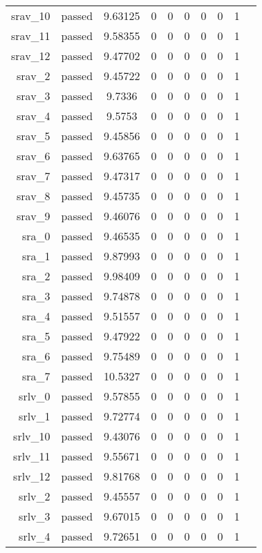 \begin{longtable}{r|ccccccccc}
    srav\_10 & passed & 9.63125 & 0 & 0 & 0 & 0 & 0 & 1 \\
    srav\_11 & passed & 9.58355 & 0 & 0 & 0 & 0 & 0 & 1 \\
    srav\_12 & passed & 9.47702 & 0 & 0 & 0 & 0 & 0 & 1 \\
    srav\_2 & passed & 9.45722 & 0 & 0 & 0 & 0 & 0 & 1 \\
    srav\_3 & passed & 9.7336 & 0 & 0 & 0 & 0 & 0 & 1 \\
    srav\_4 & passed & 9.5753 & 0 & 0 & 0 & 0 & 0 & 1 \\
    srav\_5 & passed & 9.45856 & 0 & 0 & 0 & 0 & 0 & 1 \\
    srav\_6 & passed & 9.63765 & 0 & 0 & 0 & 0 & 0 & 1 \\
    srav\_7 & passed & 9.47317 & 0 & 0 & 0 & 0 & 0 & 1 \\
    srav\_8 & passed & 9.45735 & 0 & 0 & 0 & 0 & 0 & 1 \\
    srav\_9 & passed & 9.46076 & 0 & 0 & 0 & 0 & 0 & 1 \\
    sra\_0 & passed & 9.46535 & 0 & 0 & 0 & 0 & 0 & 1 \\
    sra\_1 & passed & 9.87993 & 0 & 0 & 0 & 0 & 0 & 1 \\
    sra\_2 & passed & 9.98409 & 0 & 0 & 0 & 0 & 0 & 1 \\
    sra\_3 & passed & 9.74878 & 0 & 0 & 0 & 0 & 0 & 1 \\
    sra\_4 & passed & 9.51557 & 0 & 0 & 0 & 0 & 0 & 1 \\
    sra\_5 & passed & 9.47922 & 0 & 0 & 0 & 0 & 0 & 1 \\
    sra\_6 & passed & 9.75489 & 0 & 0 & 0 & 0 & 0 & 1 \\
    sra\_7 & passed & 10.5327 & 0 & 0 & 0 & 0 & 0 & 1 \\
    srlv\_0 & passed & 9.57855 & 0 & 0 & 0 & 0 & 0 & 1 \\
    srlv\_1 & passed & 9.72774 & 0 & 0 & 0 & 0 & 0 & 1 \\
    srlv\_10 & passed & 9.43076 & 0 & 0 & 0 & 0 & 0 & 1 \\
    srlv\_11 & passed & 9.55671 & 0 & 0 & 0 & 0 & 0 & 1 \\
    srlv\_12 & passed & 9.81768 & 0 & 0 & 0 & 0 & 0 & 1 \\
    srlv\_2 & passed & 9.45557 & 0 & 0 & 0 & 0 & 0 & 1 \\
    srlv\_3 & passed & 9.67015 & 0 & 0 & 0 & 0 & 0 & 1 \\
    srlv\_4 & passed & 9.72651 & 0 & 0 & 0 & 0 & 0 & 1 \\

\end{longtable}
